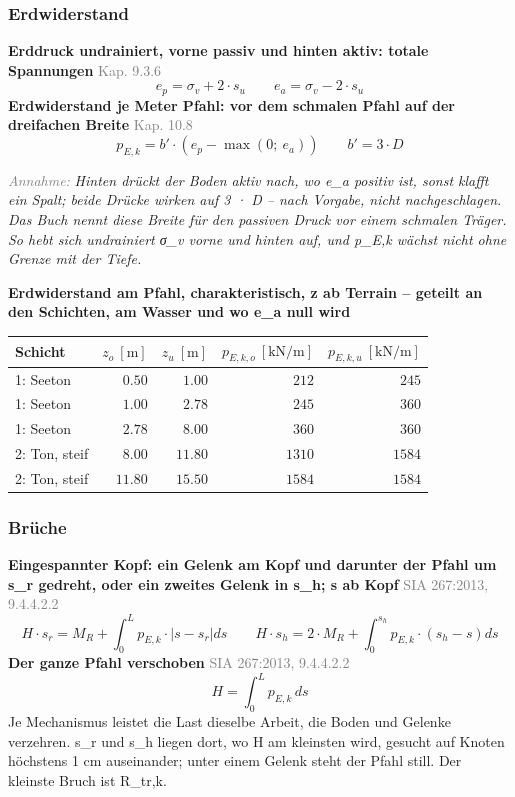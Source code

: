 \documentclass[11pt,a4paper]{article}
\newcommand{\normref}[1]{{\small\textcolor{gray}{#1}}}
\newcommand{\hinweis}[2]{\par\noindent\textcolor{gray}{\textit{#1:}} \textit{#2}\par}
\begin{document}
\subsubsection{Erdwiderstand}
\noindent\textbf{Erddruck undrainiert, vorne passiv und hinten aktiv: totale Spannungen} \hfill \normref{Kap. 9.3.6}
\begin{equation*}
e_p = \sigma_v + 2 \cdot s_u \qquad e_a = \sigma_v - 2 \cdot s_u
\end{equation*}
\noindent\textbf{Erdwiderstand je Meter Pfahl: vor dem schmalen Pfahl auf der dreifachen Breite} \hfill \normref{Kap. 10.8}
\begin{equation*}
p_{E,k} = b' \cdot \left(e_p - \max\left(0;\ e_a\right)\right) \qquad b' = 3 \cdot D
\end{equation*}
\hinweis{Annahme}{Hinten drückt der Boden aktiv nach, wo e\_a positiv ist, sonst klafft ein Spalt; beide Drücke wirken auf 3 · D -- nach Vorgabe, nicht nachgeschlagen. Das Buch nennt diese Breite für den passiven Druck vor einem schmalen Träger. So hebt sich undrainiert σ\_v vorne und hinten auf, und p\_E,k wächst nicht ohne Grenze mit der Tiefe.}
\noindent\textbf{Erdwiderstand am Pfahl, charakteristisch, z ab Terrain -- geteilt an den Schichten, am Wasser und wo e\_a null wird}
\begin{longtable}{lrrrr}
\hline
Schicht & $z_o\ [\mathrm{m}]$ & $z_u\ [\mathrm{m}]$ & $p_{E,k,o}\ [\mathrm{kN/m}]$ & $p_{E,k,u}\ [\mathrm{kN/m}]$ \\
\hline
\endhead
1: Seeton & $0.50$ & $1.00$ & $212$ & $245$ \\
1: Seeton & $1.00$ & $2.78$ & $245$ & $360$ \\
1: Seeton & $2.78$ & $8.00$ & $360$ & $360$ \\
2: Ton, steif & $8.00$ & $11.80$ & $1310$ & $1584$ \\
2: Ton, steif & $11.80$ & $15.50$ & $1584$ & $1584$ \\
\hline
\end{longtable}
\subsubsection{Brüche}
\noindent\textbf{Eingespannter Kopf: ein Gelenk am Kopf und darunter der Pfahl um s\_r gedreht, oder ein zweites Gelenk in s\_h; s ab Kopf} \hfill \normref{SIA 267:2013, 9.4.4.2.2}
\begin{equation*}
H \cdot s_r = M_R + \int_0^L p_{E,k} \cdot \left|s - s_r\right| ds \qquad H \cdot s_h = 2 \cdot M_R + \int_0^{s_h} p_{E,k} \cdot \left(s_h - s\right) ds
\end{equation*}
\noindent\textbf{Der ganze Pfahl verschoben} \hfill \normref{SIA 267:2013, 9.4.4.2.2}
\begin{equation*}
H = \int_0^L p_{E,k}\, ds
\end{equation*}
Je Mechanismus leistet die Last dieselbe Arbeit, die Boden und Gelenke verzehren. s\_r und s\_h liegen dort, wo H am kleinsten wird, gesucht auf Knoten höchstens 1 cm auseinander; unter einem Gelenk steht der Pfahl still. Der kleinste Bruch ist R\_tr,k.
\end{document}
